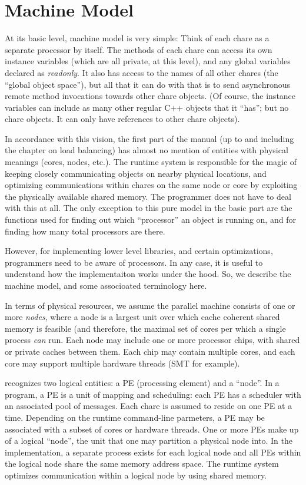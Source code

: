 \section{Machine Model}
At its basic level, \charmpp{} machine model is very simple: Think of
each chare as a separate processor by itself. The methods of each
chare can access its own instance variables (which are all private, at
this level), and any global variables declared as {\em readonly}. It
also has access to the names of all other chares (the ``global object
space''), but all that it can do with that is to send asynchronous
remote method invocations towards other chare objects. (Of course, the
instance variables can include as many other regular C++ objects that
it ``has''; but no chare objects. It can only have references to other
chare objects).

In accordance with this vision, the first part of the manual (up to
and including the chapter on load balancing) has almost no mention of
entities with physical meanings (cores, nodes, etc.). The runtime
system is responsible for the magic of keeping closely communicating
objects on nearby physical locations, and optimizing communications
within chares on the same node or core by exploiting the physically
available shared memory. The programmer does not have to deal with
this at all. The only exception to this pure model in the basic part
are the functions used for finding out which ``processor'' an object
is running on, and for finding how many total processors are there.

However, for implementing lower level libraries, and certain optimizations,
programmers need to be aware of processors. In any case, it is useful
to understand how the \charmpp{} implementaiton works under the hood. So,
we describe the machine model, and some associoated terminology here.

In terms of physical resources, we assume the parallel machine
consists of one or more {\em nodes}, where a node is a largest unit
over which cache coherent shared memory is feasible (and therefore,
the maximal set of cores per which a single process {\em can} run.
Each node may include one or more processor chips, with shared or
private caches between them. Each chip may contain multiple cores, and
each core may support multiple hardware threads (SMT for example).

\charmpp{} recognizes two logical entities: a PE (processing element) and 
a ``node''.   In a \charmpp{} program, a PE is a
unit of mapping and scheduling: each PE has a scheduler with an
associated pool of messages. Each chare is assumed to reside on one PE
at a time. Depending on the runtime command-line parmeters, a PE may
be associated with a subset of cores or hardware threads. One or more PEs
make up of a logical ``node'', the unit that one may partition a physical node
into. In the implementation, a separate
process exists for each logical node and all PEs within the logical node share
the same memory address space. The \charmpp{} runtime system optimizes
communication within a logical node by using shared memory. 


